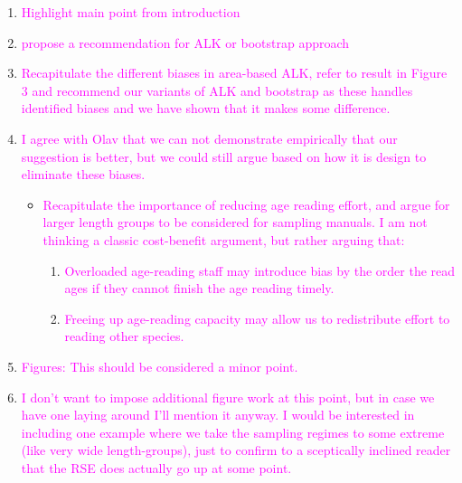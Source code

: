 \documentclass[a4paper 12pt]{article}
\numberwithin{equation}{section}
\newcommand{\natty}[1]{\textcolor{magenta}{#1}}
\begin{document}
\begin{enumerate}
\item \natty{Highlight main point from introduction}
\item \natty{propose a recommendation for ALK or bootstrap approach}
\item \natty{Recapitulate the different biases in area-based ALK, refer to result in Figure 3 and recommend our variants of ALK and bootstrap as these handles identified biases and we have shown that it makes some difference.}

\item \natty{I agree with Olav that we can not demonstrate empirically that our suggestion is better, but we could still argue based on how it is design to eliminate these biases.}

\begin{itemize}
\item  \natty{Recapitulate the importance of reducing age reading effort, and argue for larger length groups to be considered for sampling manuals. I am not thinking a classic cost-benefit argument, but rather arguing that:}

\begin{enumerate}
\item \natty{Overloaded age-reading staff may introduce bias by the order the read ages if they cannot finish the age reading timely.}

\item \natty{Freeing up age-reading capacity may allow us to redistribute effort to reading other species.}
\end{enumerate}

\end{itemize}

\item \natty{Figures: This should be considered a minor point.}

 \item \natty {I don't want to impose additional figure work at this point, but in case we have one laying around I'll mention it anyway. I would be interested in including one example where we take the sampling regimes to some extreme (like very wide length-groups), just to confirm to a sceptically inclined reader that the RSE does actually go up at some point.}
\end{enumerate}
\end{document}
